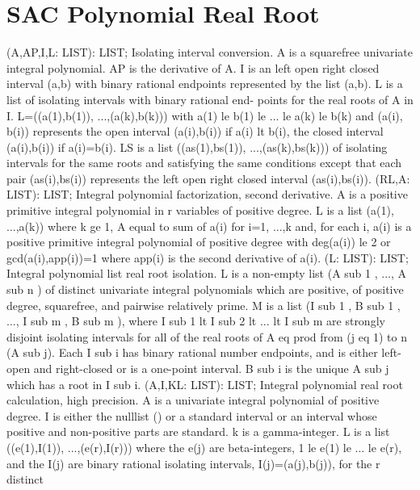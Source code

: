 \section{ SAC Polynomial Real Root  } 
 (A,AP,I,L: LIST): LIST; \eproc
\bcom Isolating interval conversion. A is a squarefree univariate integral
polynomial.  AP is the derivative of A.  I is an left open right closed
interval (a,b) with binary rational endpoints represented by the list
(a,b).  L is a list of isolating intervals with binary rational end-
points for the real roots of A in I.  L=((a(1),b(1)), ...,(a(k),b(k))) 
with a(1) le b(1) le  ... le a(k) le b(k) and (a(i), b(i)) 
represents the open interval (a(i),b(i)) if a(i) lt
b(i), the closed interval (a(i),b(i)) if a(i)=b(i).  LS is a
list ((as(1),bs(1)), ...,(as(k),bs(k))) of isolating intervals for
the same roots and satisfying the same conditions except that each pair
(as(i),bs(i)) represents the left open right closed interval
(as(i),bs(i)). \ecom 
{} (RL,A: LIST): LIST; \eproc
\bcom Integral polynomial factorization, second derivative. A is a
positive primitive integral polynomial in r variables of positive
degree.  L is a list (a(1), ...,a(k)) where k ge 1, A equal to sum of
a(i) for i=1, ...,k and, for each i, a(i) is a positive primitive
integral polynomial of positive degree with deg(a(i)) le 2 or
gcd(a(i),app(i))=1 where app(i) is the second derivative of a(i). \ecom 
{} (L: LIST): LIST; \eproc
\bcom Integral polynomial list real root isolation. L is a non-empty list
(A sub 1 ,  ..., A sub n ) of distinct univariate integral polynomials
which are positive, of positive degree, squarefree, and pairwise
relatively prime.  M is a list (I sub 1 , B sub 1 , ..., I sub m ,
B sub m ), where I sub 1  lt  I sub 2  lt   ...  lt  I sub m are
strongly disjoint isolating intervals for all of the real roots of A eq
prod from (j eq 1) to n (A sub j).  Each I sub i has binary
rational number endpoints, and is either left-open and
right-closed or is a one-point interval.  B sub i is the unique A
sub j which has a root in I sub i. \ecom 
{} (A,I,KL: LIST): LIST; \eproc
\bcom Integral polynomial real root calculation, high precision. A is a
univariate integral polynomial of positive degree.  I is either the
nulllist () or a standard interval or an interval whose positive and
non-positive parts are standard.  k is a gamma-integer.  L is a
list ((e(1),I(1)), ...,(e(r),I(r))) where the e(j) are
beta-integers,  1 le e(1) le  ... le e(r), and the I(j) are binary
rational isolating intervals, I(j)=(a(j),b(j)), for the r distinct
